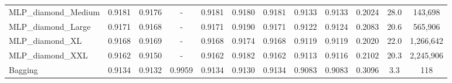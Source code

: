 \begin{table}[htbp]
{\begin{tabular}{lccccccccccc}
MLP\_diamond\_Medium & 0.9181 & 0.9176 & - & 0.9181 & 0.9180 & 0.9181 & 0.9133 & 0.9133 & 0.2024 & 28.0 & 143,698 \\
MLP\_diamond\_Large & 0.9171 & 0.9168 & - & 0.9171 & 0.9190 & 0.9171 & 0.9122 & 0.9124 & 0.2083 & 20.6 & 565,906 \\
MLP\_diamond\_XL & 0.9168 & 0.9169 & - & 0.9168 & 0.9174 & 0.9168 & 0.9119 & 0.9119 & 0.2020 & 22.0 & 1,266,642 \\
MLP\_diamond\_XXL & 0.9162 & 0.9150 & - & 0.9162 & 0.9182 & 0.9162 & 0.9113 & 0.9116 & 0.2102 & 20.3 & 2,245,906 \\
Bagging & 0.9134 & 0.9132 & 0.9959 & 0.9134 & 0.9130 & 0.9134 & 0.9083 & 0.9083 & 0.3096 & 3.3 & 118 \\
\bottomrule
\end{tabular}%
}
\end{table}